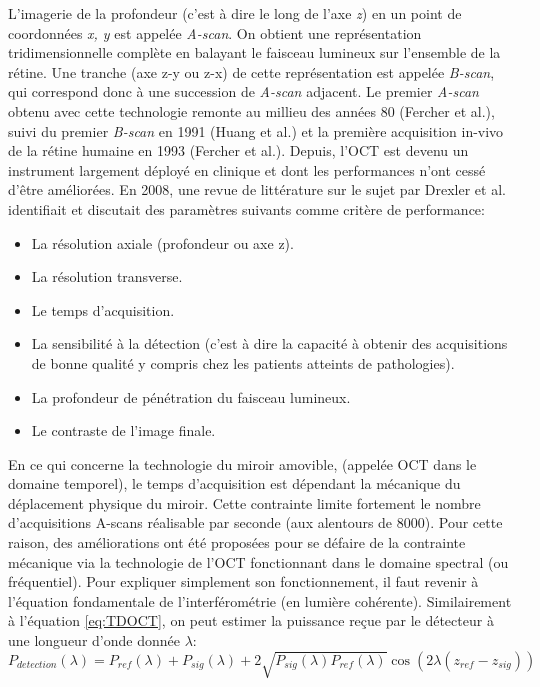 L'imagerie de la profondeur (c'est à dire le long de l'axe \textit{z}) en un point de coordonnées \textit{x, y} est appelée \textit{A-scan}. On obtient une représentation tridimensionnelle complète en balayant le faisceau lumineux sur l'ensemble de la rétine. Une tranche (axe z-y ou z-x) de cette représentation est appelée \textit{B-scan}, qui correspond donc à une succession de \textit{A-scan} adjacent.
Le premier \textit{A-scan} obtenu avec cette technologie remonte au millieu des années 80 (Fercher et al.\cite{fercherEyelengthMeasurementInterferometry1988}), suivi du premier \textit{B-scan} en 1991 (Huang et al.\cite{huangOpticalCoherenceTomography1991}) et la première acquisition in-vivo de la rétine humaine en 1993 (Fercher et al.\cite{fercherVivoOpticalCoherence1993}).
Depuis, l'OCT est devenu un instrument largement déployé en clinique et dont les performances n'ont cessé d'être améliorées. En 2008, une revue de littérature sur le sujet par Drexler et al.\cite{drexlerStateoftheartRetinalOptical2008} identifiait et discutait des paramètres suivants comme critère de performance:
\begin{itemize}
	\item La résolution axiale (profondeur ou axe z).
	\item La résolution transverse.
	\item Le temps d'acquisition.
	\item La sensibilité à la détection (c'est à dire la capacité à obtenir des acquisitions de bonne qualité y compris chez les patients atteints de pathologies).
	\item La profondeur de pénétration du faisceau lumineux.
	\item Le contraste de l'image finale.
\end{itemize}
En ce qui concerne la technologie du miroir amovible, (appelée OCT dans le domaine temporel), le temps d'acquisition est dépendant la mécanique du déplacement physique du miroir. Cette contrainte limite fortement le nombre d'acquisitions A-scans réalisable par seconde (aux alentours de 8000). Pour cette raison, des améliorations ont été proposées pour se défaire de la contrainte mécanique via la technologie de l'OCT fonctionnant dans le domaine spectral (ou fréquentiel).
Pour expliquer simplement son fonctionnement, il faut revenir à l'équation fondamentale de l'interférométrie (en lumière cohérente). Similairement à l'équation \ref{eq:TDOCT}, on peut estimer la puissance reçue par le détecteur à une longueur d'onde donnée $\lambda$:
\begin{equation}
	\label{eq:SDOCT}
	P_{detection}(\lambda) = P_{ref}(\lambda)+P_{sig}(\lambda) + 2\sqrt{P_{sig}(\lambda)P_{ref}(\lambda)}\cos(2\lambda(z_{ref}-z_{sig}))
\end{equation}
